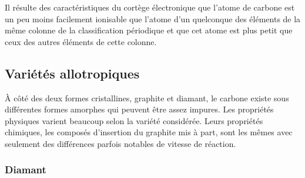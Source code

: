 \documentclass[]{article}
\begin{document}
Il résulte des caractéristiques du cortège
électronique que l'atome de carbone est un peu moins facilement
ionisable que l'atome d'un quelconque des éléments de la même
colonne de la classification périodique  et que cet atome est plus petit que ceux des autres
éléments de cette colonne.  


\subsection{Variétés allotropiques} 

À côté des deux formes cristallines, graphite et diamant, le
carbone existe sous différentes formes amorphes qui peuvent être
assez impures. Les propriétés physiques varient beaucoup selon
la variété considérée. Leurs propriétés chimiques,
les composés d'insertion du graphite mis à part, sont les
mêmes avec seulement des différences parfois notables de vitesse
de réaction.  

\subsubsection{Diamant} 
\end{document}
